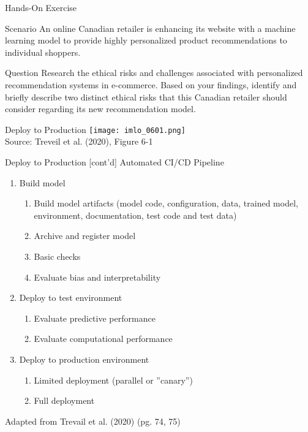 \documentclass[ignorenonframetext,xcolor=x11names]{beamer}
\begin{document}
\begin{frame}{Hands-On Exercise}

\begin{block}{Scenario}
An online Canadian retailer is enhancing its website with a machine learning model to provide highly personalized product recommendations to individual shoppers.
\end{block}

\begin{block}{Question}
Research the ethical risks and challenges associated with personalized recommendation systems in e-commerce. Based on your findings, identify and briefly describe two distinct ethical risks that this Canadian retailer should consider regarding its new recommendation model.
\end{block}
\end{frame}




\begin{frame}{Deploy to Production}
\centering
\texttt{[image: imlo\_0601.png]} \\

\vspace{\baselineskip}
\scriptsize Source: Treveil et al. (2020), Figure 6-1
\end{frame}

\begin{frame}{Deploy to Production \small [cont'd]}
\large Automated CI/CD Pipeline \normalsize \\

\begin{enumerate}
\item Build model
\begin{enumerate}
   \item Build model artifacts (model code, configuration, data, trained model, environment, documentation, test code and test data)
   \item Archive and register model
   \item Basic checks
   \item Evaluate bias and interpretability 
\end{enumerate}
\item Deploy to test environment
\begin{enumerate}
    \item Evaluate predictive performance
    \item Evaluate computational performance
\end{enumerate}
\item Deploy to production environment
\begin{enumerate}
   \item Limited deployment (parallel or ''canary'')
   \item Full deployment
\end{enumerate}
\end{enumerate} 

\vspace{\baselineskip}
\tiny Adapted from Trevail et al. (2020) (pg. 74, 75)
\end{frame}
\end{document}
